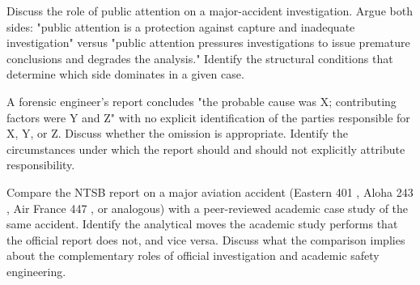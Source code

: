 \begin{exercise}
Discuss the role of public attention on a major-accident investigation. Argue both sides: "public attention is a protection against capture and inadequate investigation" versus "public attention pressures investigations to issue premature conclusions and degrades the analysis." Identify the structural conditions that determine which side dominates in a given case.
\end{exercise}

\begin{exercise}
A forensic engineer's report concludes "the probable cause was X; contributing factors were Y and Z" with no explicit identification of the parties responsible for X, Y, or Z. Discuss whether the omission is appropriate. Identify the circumstances under which the report should and should not explicitly attribute responsibility.
\end{exercise}

\begin{exercise}
Compare the NTSB report on a major aviation accident (Eastern 401 \cite{acc:ntsb-aar73-14}, Aloha 243 \cite{acc:ntsb-aar94-04}, Air France 447 \cite{acc:bea-af447}, or analogous) with a peer-reviewed academic case study of the same accident. Identify the analytical moves the academic study performs that the official report does not, and vice versa. Discuss what the comparison implies about the complementary roles of official investigation and academic safety engineering.
\end{exercise}
